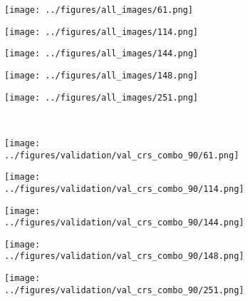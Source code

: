 \begin{figure}[h!]
	\centering
	\begin{subfigure}{0.19\textwidth}
		\centering
		\texttt{[image: ../figures/all\_images/61.png]}
		\label{fig:1}
	\end{subfigure}
	\begin{subfigure}{0.19\textwidth}
		\centering
		\texttt{[image: ../figures/all\_images/114.png]}
		\label{fig:1}
	\end{subfigure}
	\begin{subfigure}{0.19\textwidth}
		\centering
		\texttt{[image: ../figures/all\_images/144.png]}
		\label{fig:1}
	\end{subfigure}
	\begin{subfigure}{0.19\textwidth}
		\centering
		\texttt{[image: ../figures/all\_images/148.png]}
		\label{fig:1}
	\end{subfigure}
	\begin{subfigure}{0.19\textwidth}
		\centering
		\texttt{[image: ../figures/all\_images/251.png]}
		\label{fig:1}
	\end{subfigure}
	\vspace{-0.35cm}
	\\
	\begin{subfigure}{0.19\textwidth}
		\centering
		\texttt{[image: ../figures/validation/val\_crs\_combo\_90/61.png]}
		\label{fig:1}
	\end{subfigure}
	\begin{subfigure}{0.19\textwidth}
		\centering
		\texttt{[image: ../figures/validation/val\_crs\_combo\_90/114.png]}
		\label{fig:1}
	\end{subfigure}
	\begin{subfigure}{0.19\textwidth}
		\centering
		\texttt{[image: ../figures/validation/val\_crs\_combo\_90/144.png]}
		\label{fig:1}
	\end{subfigure}
	\begin{subfigure}{0.19\textwidth}
		\centering
		\texttt{[image: ../figures/validation/val\_crs\_combo\_90/148.png]}
		\label{fig:1}
	\end{subfigure}
	\begin{subfigure}{0.19\textwidth}
		\centering
		\texttt{[image: ../figures/validation/val\_crs\_combo\_90/251.png]}
		\label{fig:1}
	\end{subfigure}
	\vspace{-0.35cm}

\end{figure}

